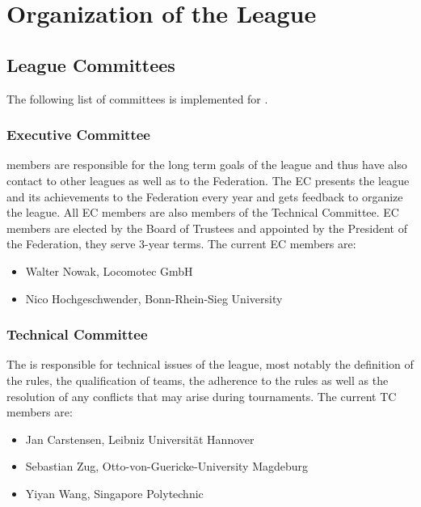 \section{Organization of the League}\label{sec:organisation_of_the_league}

\subsection{League Committees}
The following list of committees is implemented for \RCAW.

\subsubsection{Executive Committee}

 members are responsible for the long term goals of the league and thus have also contact to other leagues as well as to the \RC Federation. The EC presents the league and its achievements to the \RC Federation every year and gets feedback to organize the league. All EC members are also members of the Technical Committee. EC members are elected by the Board of Trustees and appointed by the President of the \RC Federation, they serve 3-year terms. The current EC members are:

\begin{itemize}
	\item Walter Nowak, Locomotec GmbH
	\item Nico Hochgeschwender, Bonn-Rhein-Sieg University
\end{itemize}


\subsubsection{Technical Committee}
The  is responsible for technical issues of the league, most notably the definition of the rules, the qualification of teams, the adherence to the rules as well as the resolution of any conflicts that may arise during tournaments. The current TC members are:

\begin{itemize}
	\item Jan Carstensen, Leibniz Universit\"at Hannover
	\item Sebastian Zug, Otto-von-Guericke-University Magdeburg
	\item Yiyan Wang, Singapore Polytechnic
\end{itemize}


